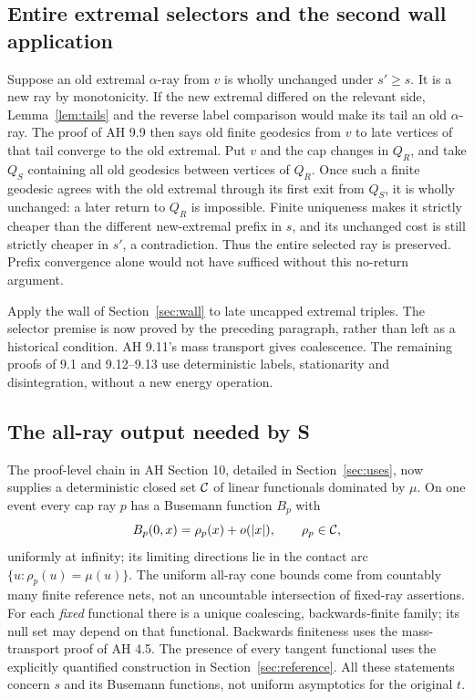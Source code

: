 \subsection{Entire extremal selectors and the second wall application}
Suppose an old extremal $\alpha$-ray from $v$ is wholly unchanged under
$s'\ge s$. It is a new ray by monotonicity. If the new extremal differed
on the relevant side, Lemma~\ref{lem:tails} and the reverse label comparison
would make its tail an old $\alpha$-ray. The proof of AH 9.9 then says old
finite geodesics from $v$ to late vertices of that tail converge to the old
extremal. Put $v$ and the cap changes in $Q_R$, and take $Q_S$ containing
all old geodesics between vertices of $Q_R$. Once such a finite geodesic
agrees with the old extremal through its first exit from $Q_S$, it is wholly
unchanged: a later return to $Q_R$ is impossible. Finite uniqueness makes
it strictly cheaper than the different new-extremal prefix in $s$, and its
unchanged cost is still strictly cheaper in $s'$, a contradiction.
Thus the entire selected ray is preserved. Prefix convergence alone would
not have sufficed without this no-return argument.

Apply the wall of Section~\ref{sec:wall} to late uncapped extremal triples.
The selector premise is now proved by the preceding paragraph, rather than
left as a historical condition. AH 9.11's mass transport gives coalescence.
The remaining proofs of 9.1 and 9.12--9.13 use deterministic labels,
stationarity and disintegration, without a new energy operation.

\subsection{The all-ray output needed by S}\label{sec:allray}
The proof-level chain in AH Section 10, detailed in Section~\ref{sec:uses},
now supplies a deterministic closed set $\mathcal C$ of linear functionals
dominated by $\mu$. On one event every cap ray $p$ has a Busemann function
$B_p$ with
\[
 B_p(0,x)=\rho_p(x)+o(|x|),\qquad\rho_p\in\mathcal C,
\]
uniformly at infinity; its limiting directions lie in the contact arc
$\{u:\rho_p(u)=\mu(u)\}$. The uniform all-ray cone bounds come from
countably many finite reference nets, not an uncountable intersection of
fixed-ray assertions. For each \emph{fixed} functional there is a unique
coalescing, backwards-finite family; its null set may depend on that
functional. Backwards finiteness uses the mass-transport proof of AH 4.5.
The presence of every tangent functional uses the explicitly quantified
construction in Section~\ref{sec:reference}. All these statements concern
$s$ and its Busemann functions, not uniform asymptotics for the original $t$.

